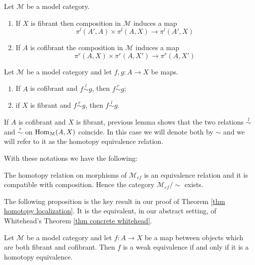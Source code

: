 \begin{refsection}
\begin{lemma} \label{lemma hom homotopy category}
Let $\mathcal M$ be a model category.
\begin{enumerate}
\item If $X$ is fibrant then composition in $\mathcal M$ induces a map
\[
\pi^l(A',A) \times \pi^l(A,X) \to \pi^l(A',X)
\]
\item If $A$ is cofibrant the composition in $\mathcal M$ induces a map
\[
\pi^r(A,X) \times \pi^r(A,X') \to \pi^r(A,X')
\]
\end{enumerate}
\end{lemma}

\begin{lemma}
Let $\mathcal M$ be a model category and let $f,g \colon A \to X$ be maps.
\begin{enumerate}
\item If $A$ is cofibrant and $f \stackrel{l}{\sim} g$, then $f \stackrel{r}{\sim} g$;
\item if $X$ is fibrant and $f \stackrel{r}{\sim} g$, then $f \stackrel{l}{\sim} g$.
\end{enumerate}
\end{lemma}

\begin{notation}
If $A$ is cofibrant and $X$ is fibrant, previous lemma shows that the two relations $\stackrel{l}{\sim}$ and $\stackrel{r}{\sim}$ on $\mathrm{Hom}_{\mathcal M}(A,X)$ coincide. In this case we will denote both by $\sim$ and we will refer to it as the homotopy equivalence relation.
\end{notation}

With these notations we have the following:

\begin{cor} \label{cor weak homotopy category}
The homotopy relation on morphisms of $\mathcal M_{cf}$ is an equivalence relation and it is compatible with composition. Hence the category $\mathcal M_{cf} / \sim$ exists.
\end{cor}

The following proposition is the key result in our proof of Theorem \ref{thm homotopy localization}. It is the equivalent, in our abstract setting, of Whitehead's Theorem \ref{thm concrete whitehead}.

\begin{thm} \label{thm abstract whitehead}
Let $\mathcal M$ be a model category and let $f \colon A \to X$ be a map between objects which are both fibrant and cofibrant. Then $f$ is a weak equivalence if and only if it is a homotopy equivalence.
\end{thm}


\end{refsection}

